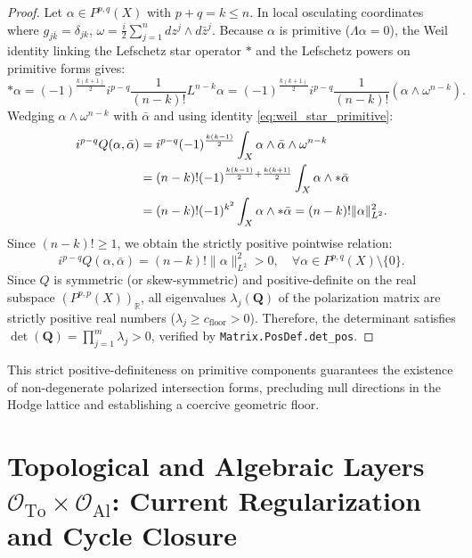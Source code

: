 \documentclass[11pt,a4paper]{article}
\theoremstyle{definition}
\theoremstyle{plain}
\begin{document}
\begin{proof}
Let $\alpha \in P^{p,q}(X)$ with $p + q = k \le n$. In local osculating coordinates where $g_{j\bar{k}} = \delta_{jk}$, $\omega = \frac{i}{2} \sum_{j=1}^n dz^j \wedge d\bar{z}^j$. Because $\alpha$ is primitive ($\Lambda \alpha = 0$), the Weil identity linking the Lefschetz star operator $*$ and the Lefschetz powers on primitive forms gives:
\begin{equation}
    \label{eq:weil_star_primitive}
    * \alpha = (-1)^{\frac{k(k+1)}{2}} i^{p-q} \frac{1}{(n-k)!} L^{n-k} \alpha = (-1)^{\frac{k(k+1)}{2}} i^{p-q} \frac{1}{(n-k)!} (\alpha \wedge \omega^{n-k}).
\end{equation}
Wedging $\alpha \wedge \omega^{n-k}$ with $\bar{\alpha}$ and using identity \eqref{eq:weil_star_primitive}:
\begin{align}
    i^{p-q} Q(\alpha, \bar{\alpha}) &= i^{p-q} (-1)^{\frac{k(k-1)}{2}} \int_X \alpha \wedge \bar{\alpha} \wedge \omega^{n-k} \notag \\
    &= (n-k)! (-1)^{\frac{k(k-1)}{2} + \frac{k(k+1)}{2}} \int_X \alpha \wedge * \bar{\alpha} \notag \\
    &= (n-k)! (-1)^{k^2} \int_X \alpha \wedge * \bar{\alpha} = (n-k)! \|\alpha\|_{L^2}^2.
\end{align}
Since $(n-k)! \ge 1$, we obtain the strictly positive pointwise relation:
\begin{equation}
    i^{p-q} Q(\alpha, \bar{\alpha}) = (n-k)! \|\alpha\|_{L^2}^2 > 0, \quad \forall \alpha \in P^{p,q}(X) \setminus \{0\}.
\end{equation}
Since $Q$ is symmetric (or skew-symmetric) and positive-definite on the real subspace $(P^{p,p}(X))_\mathbb{R}$, all eigenvalues $\lambda_j(\mathbf{Q})$ of the polarization matrix are strictly positive real numbers ($\lambda_j \ge c_{\mathrm{floor}} > 0$). Therefore, the determinant satisfies $\det(\mathbf{Q}) = \prod_{j=1}^m \lambda_j > 0$, verified by \texttt{Matrix.PosDef.det\_pos}.
\end{proof}
This strict positive-definiteness on primitive components guarantees the existence of non-degenerate polarized intersection forms, precluding null directions in the Hodge lattice and establishing a coercive geometric floor.

\section{Topological and Algebraic Layers $\mathcal{O}_{\mathrm{To}} \times \mathcal{O}_{\mathrm{Al}}$: Current Regularization and Cycle Closure}
\label{sec:topological}
\label{sec:algebraic}
\end{document}
